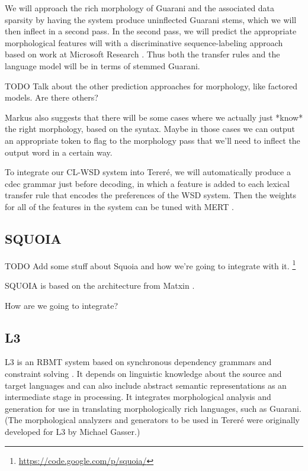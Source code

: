 We will approach the rich morphology of Guarani and the associated data
sparsity by having the system produce uninflected Guarani stems,
which we will then inflect in a second pass.
In the second pass, we will predict the appropriate morphological features will
with a discriminative sequence-labeling approach based on work at Microsoft
Research \cite{toutanova-suzuki-ruopp:2008:ACLMain}.
Thus both the transfer rules and the language model will be in terms of stemmed
Guarani.

TODO Talk about the other prediction approaches for morphology, like factored
models. Are there others?

Markus also suggests that there will be some cases where we actually just
*know* the right morphology, based on the syntax. Maybe in those cases we can
output an appropriate token to flag to the morphology pass that we'll need to
inflect the output word in a certain way.

To integrate our CL-WSD system into Tereré, we will automatically produce a
cdec grammar just before decoding, in which a feature is added to each lexical
transfer rule that encodes the preferences of the WSD system.
Then the weights for all of the features in the system can be tuned with MERT
\cite{och:2003:ACL}.

\subsection{SQUOIA}
TODO Add some stuff about Squoia and how we're going to integrate with it.
\cite{riosgonzales-gohring:2013:HyTra}
\footnote{\url{https://code.google.com/p/squoia/}}


SQUOIA is based on the architecture from Matxin \cite{matxin_2005}. 

How are we going to integrate?

\subsection{L3}

\cite{gasser:sxdg}

L3 is an RBMT system based on synchronous dependency grammars and constraint
solving \cite{gasser:sxdg,gasser:aflat2012}.
It depends on linguistic knowledge about the source and target languages and
can also include abstract semantic representations as an intermediate stage in
processing. It integrates morphological analysis and generation for use in
translating morphologically rich languages, such as Guarani.
(The morphological analyzers and generators to be used in Tereré were
originally developed for L3 by Michael Gasser.)

